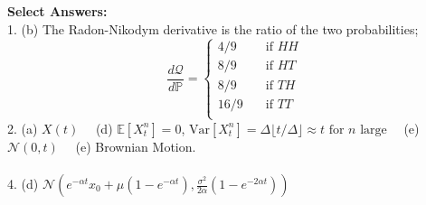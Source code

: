 \documentclass[11pt]{article}
\newcommand{\PR}{\mathbb{P}}
\begin{document}
	\textbf{Select Answers:}\\
	1. (b) The Radon-Nikodym derivative is the ratio of the two probabilities;
	\[	\frac{d\mathcal{Q}}{d\PR} = \begin{cases}
		4/9 & \quad \text{if }HH\\
		8/9 & \quad \text{if }HT\\
		8/9 & \quad \text{if }TH\\
		16/9 & \quad \text{if }TT\\
	\end{cases}
	\] 
	2. (a) $X(t)\quad$ (d) $\mathbb{E}[X^{n}_{t}] = 0$, $\text{Var}[X^{n}_{t}] = \Delta \lfloor t/ \Delta\rfloor\approx t \text{ for $n$ large}\quad$ (e) $\mathcal{N}(0,t)\quad$ (e) Brownian Motion.\\\\
	4. (d) $\mathcal{N}\left(e^{-\alpha t}x_{0} + \mu(1 - e^{-\alpha t}), \frac{\sigma^{2}}{2\alpha}(1 - e^{-2\alpha t})\right)$
\end{document}

